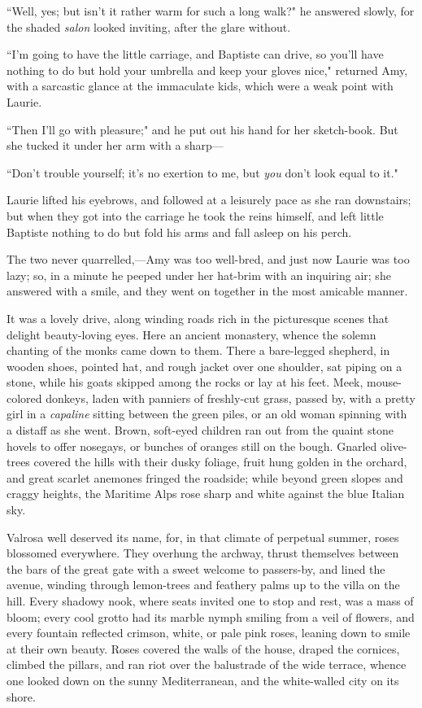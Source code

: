 ``Well, yes; but isn't it rather warm for such a long
walk?" he answered slowly, for the shaded \emph{salon} looked inviting,
after the glare without.

``I'm going to have the little carriage, and Baptiste can
drive, so you'll have nothing to do but hold your
umbrella and keep your gloves nice," returned Amy, with a sarcastic
glance at the immaculate kids, which were a weak point with Laurie.

``Then I'll go with pleasure;" and he put out his hand
for her sketch-book. But she tucked it under her arm with a sharp---

``Don't trouble yourself; it's no
exertion to me, but \emph{you} don't look equal to it."

Laurie lifted his eyebrows, and followed at a leisurely pace as she ran
downstairs; but when they got into the carriage he took the reins
himself, and left little Baptiste nothing to do but fold his arms and
fall asleep on his perch.

The two never quarrelled,---Amy was too well-bred, and just now Laurie
was too lazy; so, in a minute he peeped under her hat-brim with an
inquiring air; she answered with a smile, and they went on together in
the most amicable manner.

It was a lovely drive, along winding roads rich in the picturesque
scenes that delight beauty-loving eyes. Here an ancient monastery,
whence the solemn chanting of the monks came down to them. There a
bare-legged shepherd, in wooden shoes, pointed hat, and rough jacket
over one shoulder, sat piping on a stone, while his goats skipped among
the rocks or lay at his feet. Meek, mouse-colored donkeys, laden with
panniers of freshly-cut grass, passed by, with a pretty girl in a
\emph{capaline} sitting between the green piles, or an old woman
spinning with a distaff as she went. Brown, soft-eyed children ran out
from the quaint stone hovels to offer nosegays, or bunches of oranges
still on the bough. Gnarled olive-trees covered the hills with their
dusky foliage, fruit hung golden in the orchard, and great scarlet
anemones fringed the roadside; while beyond green slopes and craggy
heights, the Maritime Alps rose sharp and white against the blue Italian
sky.

Valrosa well deserved its name, for, in that climate of perpetual
summer, roses blossomed everywhere. They overhung the archway, thrust
themselves between the bars of the great gate with a sweet welcome to
passers-by, and lined the avenue, winding through lemon-trees and
feathery palms up to the villa on the hill. Every shadowy nook, where
seats invited one to stop and rest, was a mass of bloom; every cool
grotto had its marble nymph smiling from a veil of flowers, and every
fountain reflected crimson, white, or pale pink roses, leaning down to
smile at their own beauty. Roses covered the walls of the house, draped
the cornices, climbed the pillars, and ran riot over the balustrade of
the wide terrace, whence one looked down on the sunny Mediterranean, and
the white-walled city on its shore.

